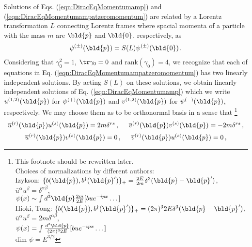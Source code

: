 Solutions of Eqs. (\ref{eqn:DiracEqMomentumamp}) and
(\ref{eqn:DiracEqMomentumampatzeromomentum})
are related by a Lorentz transformation $L$
connecting Lorentz frames where
spacial momenta of a particle with the mass $m$ are
$\bld{p}$ and $\bld{0}$, respectively,
as
\begin{eqnarray}
\psi^{(\pm)}(\bld{p}) = S(L) \psi^{(\pm)}(\bld{0}) \,.
\end{eqnarray}
Considering that $\gamma_0^2 =1$, $\tr \gamma_0 = 0$ and rank$(\gamma_0) = 4$,
we recognize that each of equations in Eq. (\ref{eqn:DiracEqMomentumampatzeromomentum})
has  two  linearly independent solutions.
By acting $S(L)$ on 
these solutions, we obtain linearly independent solutions of Eq. (\ref{eqn:DiracEqMomentumamp})
which we write $u^{(1, 2)}(\bld{p})$ for $\psi^{(+)}(\bld{p})$ and $v^{(1,2)}(\bld{p})$
 for $\psi^{(-)}(\bld{p})$, respectively. 
We may choose them as to be orthonormal basis in a sense that
\footnote{%
This footnote should be rewritten later.\\
Choices of normalizations by different authors:\\
Izykson: $\{ b(\bld{p}),b^\dagger(\bld{p}') \}_+ = \frac{2E}{2m}\delta^3(\bld{p}-\bld{p}')$,
$\bar{u}^\alpha u^\beta = \delta^{\alpha \beta}$,\\
\hspace{20mm}$\psi(x) \sim \int d^3\bld{p}\frac{2m}{2E}[ b u e^{-ipx} \dots]$\\
Hioki, Tong: $\{ b(\bld{p}),b^\dagger(\bld{p}') \}_+ = (2\pi)^3 2E\delta^3(\bld{p}-\bld{p}')$,
$\bar{u}^\alpha u^\beta = 2m \delta^{\alpha \beta}$,\\
\hspace{20mm}$\psi(x) = \int \frac{d^3\bld{p}}{(2\pi)^32E}[ b u e^{-ipx} \dots]$\\
dim $\psi = E^{3/2}$
}%
\begin{eqnarray}
\begin{array}{c}
\overline{u}^{(r)}(\bld{p})
u^{(s)}(\bld{p})
= 2m \delta^{rs}\,,
\hspace{5mm}
\overline{v}^{(r)}(\bld{p})
v^{(s)}(\bld{p})
= -2m \delta^{rs}\,,
\vspace{2mm}
\\
\overline{u}^{(r)}(\bld{p})
v^{(s)}(\bld{p})
= 0\,,
\hspace{5mm}
\overline{v}^{(r)}(\bld{p})
u^{(s)}(\bld{p})
= 0 \,,
\end{array}
\label{eqn:DiracspinorNormalization}
\end{eqnarray}
